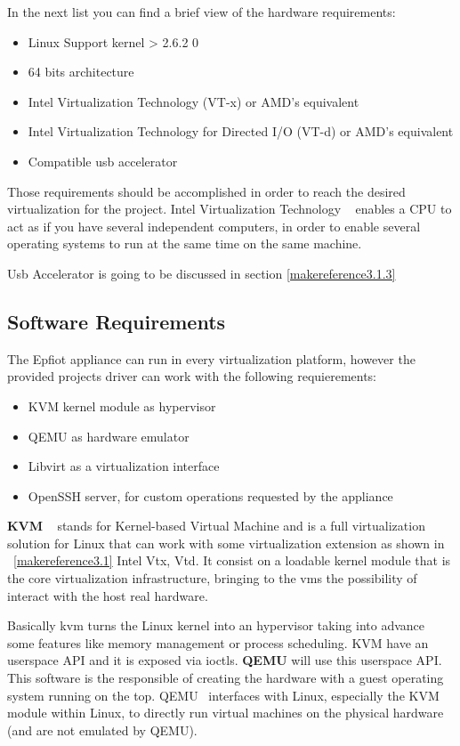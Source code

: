 In the next list you can find a brief view of the hardware requirements:

\begin{itemize}
    \item Linux Support kernel > 2.6.2  0
    \item 64 bits architecture
    \item Intel Virtualization Technology (VT-x) or AMD's equivalent
    \item Intel Virtualization Technology for Directed I/O (VT-d) or AMD's equivalent
    \item Compatible usb accelerator
\end{itemize}

Those requirements should be accomplished in order to reach the desired virtualization for the project.
Intel Virtualization Technology ~\cite{vtx} enables a CPU to act as if you have several independent computers, in order to enable several operating systems to run at the same time on the same machine.

Usb Accelerator is going to be discussed in section \ref{makereference3.1.3}

\subsection{Software Requirements}
\label{makereference3.1.2}

The Epfiot appliance can run in every virtualization platform, however the provided projects driver can work with the following requierements:

\begin{itemize}
    \item KVM kernel module as hypervisor
    \item QEMU as hardware emulator
    \item Libvirt as a virtualization interface
    \item OpenSSH server, for custom operations requested by the appliance
\end{itemize}

\textbf{KVM} ~\cite{kvm} stands for Kernel-based Virtual Machine and is a full virtualization solution for Linux that can work with some virtualization extension as shown in ~\ref{makereference3.1} Intel Vtx, Vtd. It consist on a loadable kernel module that is the core virtualization infrastructure, bringing to the vms the possibility of interact with the host real hardware.

Basically kvm turns the Linux kernel into an hypervisor taking into advance some features like memory management or process scheduling. KVM have an userspace API and it is exposed via ioctls.
\textbf{QEMU} will use this userspace API. This software is the responsible of creating the hardware with a guest operating system running on the top. QEMU ~\cite{virtualization}interfaces with Linux, especially the KVM module within Linux, to directly run virtual machines on the physical hardware (and are not emulated by QEMU).

